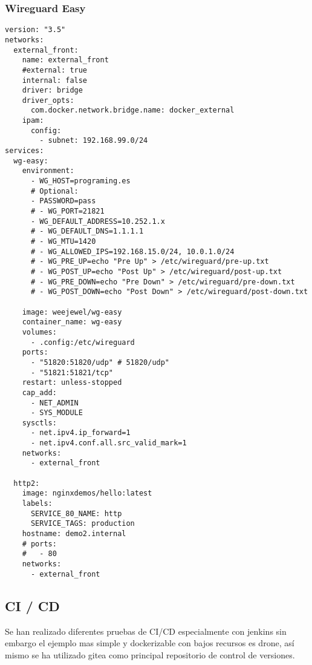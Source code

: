 \subsubsection{Wireguard Easy}
\begin{lstlisting}[style=yaml, caption={docker-compose.yml Wireguard Easy prueba de concepto.}, label={lst:wg-easy} ]
version: "3.5"
networks:
  external_front:
    name: external_front
    #external: true
    internal: false
    driver: bridge
    driver_opts:
      com.docker.network.bridge.name: docker_external
    ipam:
      config:
        - subnet: 192.168.99.0/24
services:
  wg-easy:
    environment:
      - WG_HOST=programing.es
      # Optional:
      - PASSWORD=pass
      # - WG_PORT=21821
      - WG_DEFAULT_ADDRESS=10.252.1.x
      # - WG_DEFAULT_DNS=1.1.1.1
      # - WG_MTU=1420
      # - WG_ALLOWED_IPS=192.168.15.0/24, 10.0.1.0/24
      # - WG_PRE_UP=echo "Pre Up" > /etc/wireguard/pre-up.txt
      # - WG_POST_UP=echo "Post Up" > /etc/wireguard/post-up.txt
      # - WG_PRE_DOWN=echo "Pre Down" > /etc/wireguard/pre-down.txt
      # - WG_POST_DOWN=echo "Post Down" > /etc/wireguard/post-down.txt
      
    image: weejewel/wg-easy
    container_name: wg-easy
    volumes:
      - .config:/etc/wireguard
    ports:
      - "51820:51820/udp" # 51820/udp"
      - "51821:51821/tcp"
    restart: unless-stopped
    cap_add:
      - NET_ADMIN
      - SYS_MODULE
    sysctls:
      - net.ipv4.ip_forward=1
      - net.ipv4.conf.all.src_valid_mark=1
    networks:
      - external_front

  http2:
    image: nginxdemos/hello:latest
    labels:
      SERVICE_80_NAME: http
      SERVICE_TAGS: production
    hostname: demo2.internal
    # ports:
    #   - 80
    networks:
      - external_front
\end{lstlisting}

\subsection{CI / CD}\label{S:ci_ejemplo}
Se han realizado diferentes pruebas de CI/CD especialmente con jenkins sin embargo el ejemplo mas simple y dockerizable con bajos recursos es drone, así mismo se ha utilizado gitea\cite{c_gitea} como principal repositorio de control de versiones.

